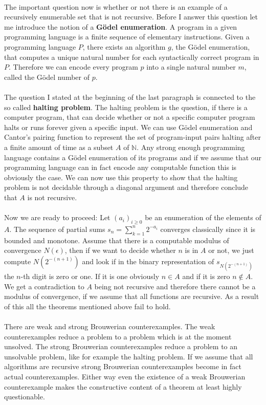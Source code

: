 \documentclass[11pt,a4paper,leqno]{report}
\numberwithin{equation}{chapter}
\begin{document}
\\
The important question now is whether or not there is an example of a recursively enumerable set that is not recursive. 
Before I answer this question let me introduce the notion of a \textbf{G\"odel enumeration}. A program in a given programming language is a finite sequence of elementary instructions. Given a programming language $P$, there exists an algorithm $g$, the G\"odel enumeration, that computes a unique natural number for each syntactically correct program in $P$. Therefore we can encode every program $p$ into a single natural number $m$, called the G\"odel number of $p$.\\
\\
The question I stated at the beginning of the last paragraph is connected to the so called \textbf{halting problem}. The halting problem is the question, if there is a computer program, that can decide whether or not a specific computer program halts or runs forever given a specific input. We can use G\"odel enumeration and Cantor's pairing function to represent the set of program-input pairs halting after a finite amount of time as a subset $A$ of $\mathbb{N}$. Any strong enough programming language contains a G\"odel enumeration of its programs and if we assume that our programming language can in fact encode any computable function this is obviously the case. We can now use this property to show that the halting problem is not decidable through a diagonal argument and therefore conclude that $A$ is not recursive.
\\
\\
Now we are ready to proceed: Let $(a_i)_{i\geq 0}$ be an enumeration of the elements of $A$. The sequence of partial sums $s_n=\sum_{k=1}^n 2^{-a_i}$ converges classically since it is bounded and monotone. Assume that there is a computable modulus of convergence $N(\epsilon)$, then if we want to decide whether $n$ is in $A$ or not, we just compute $N(2^{-(n+1)})$ and look if in the binary representation of $s_{N(2^{-(n+1)})}$ the $n$-th digit is zero or one. If it is one obviously $n\in A$ and if it is zero $n\notin A$.
We get a contradiction to $A$ being not recursive and therefore there cannot be a modulus of convergence, if we assume that all functions are recursive. As a result of this all the theorems mentioned above fail to hold.\\
\\
There are weak and strong Brouwerian counterexamples. The weak counterexamples reduce a problem to a problem which is at the moment unsolved. The strong Brouwerian counterexamples reduce a problem to an unsolvable problem, like for example the halting problem. If we assume that all algorithms are recursive strong Brouwerian counterexamples become in fact actual counterexamples. Either way even the existence of a weak Brouwerian counterexample makes the constructive content of a theorem at least highly questionable.
\end{document}
